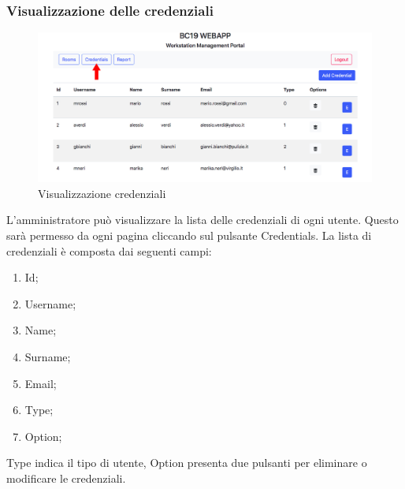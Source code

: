 \subsubsection{Visualizzazione delle credenziali}
\begin{figure}[H]
	\centering
	\includegraphics[width=15cm]{res/images/credential.jpg}
	\caption{Visualizzazione credenziali}
\end{figure}
L’amministratore può visualizzare la lista delle credenziali di ogni utente. Questo sarà permesso da ogni pagina cliccando sul pulsante Credentials.
La lista di credenziali è composta dai seguenti campi:
\begin{enumerate}
\item Id;
\item Username;
\item Name;
\item Surname;
\item Email;
\item Type;
\item Option;
\end{enumerate}
Type indica il tipo di utente, Option presenta due pulsanti per eliminare o modificare le credenziali.

